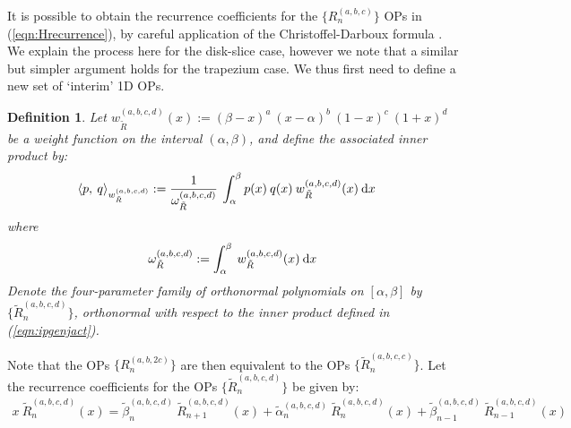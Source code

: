 \documentclass[11pt, oneside]{article}   	%
\newcommand{\bstodo}{\todo[color=pink]}
\newcommand{\genjac}{R}
\newcommand{\genjact}{\tilde{\genjac}}
\newcommand{\genjactw}{w_{\genjact}}
\newcommand{\normgenjact}{\omega_{\genjact}}
\newtheorem{definition}{Definition}
\begin{document}

It is possible to obtain the recurrence coefficients for the $\{\genjac_n^{(a,b,c)}\}$ OPs in (\ref{eqn:Hrecurrence}), by careful application of the Christoffel-Darboux formula \bstodo{Link!!!}. We explain the process here for the disk-slice case, however we note that a similar but simpler argument holds for the trapezium case. We thus first need to define a new set of `interim' 1D OPs.
\begin{definition}\label{def:InterimOPconstruction}
Let $\genjactw^{(a,b,c,d)}(x) := (\beta - x)^a \: (x - \alpha)^{b} \: (1-x)^{c} \: (1+x)^{d} $ be a weight function on the interval $(\alpha, \beta)$, and define the associated inner product by:
\begin{align}
	\ip< p, \: q >_{\genjactw^{(a,b,c,d)}} &:= \frac{1}{\normgenjact^{(a,b,c,d)}} \: \int_\alpha^\beta p(x) \: q(x) \: \genjactw^{(a,b,c,d)}(x) \: \D x \label{eqn:ipgenjact}
\end{align}
where
\begin{align}
	\normgenjact^{(a,b,c,d)} := \int_\alpha^\beta \: \genjactw^{(a,b,c,d)}(x) \: \D x
\end{align}
Denote the four-parameter family of orthonormal polynomials on $[\alpha,\beta]$ by $\{\genjact_n^{(a,b,c,d)}\}$, orthonormal with respect to the inner product defined in (\ref{eqn:ipgenjact}).
\end{definition}
Note that the OPs $\{\genjac_n^{(a,b,2c)}\}$ are then equivalent to the OPs $\{\genjact_n^{(a,b,c,c)}\}$. Let the recurrence coefficients for the OPs $\{\genjact_n^{(a,b,c,d)}\}$ be given by:
\begin{align}
	x \: \genjact_n^{(a,b,c,d)}(x) = \tilde{\beta}_n^{(a,b,c,d)} \: \genjact_{n+1}^{(a,b,c,d)}(x) + \tilde{\alpha}_n^{(a,b,c,d)} \:\genjact_n^{(a,b,c,d)}(x) + \tilde{\beta}_{n-1}^{(a,b,c,d)} \: \genjact_{n-1}^{(a,b,c,d)}(x)
\end{align}
\end{document}
